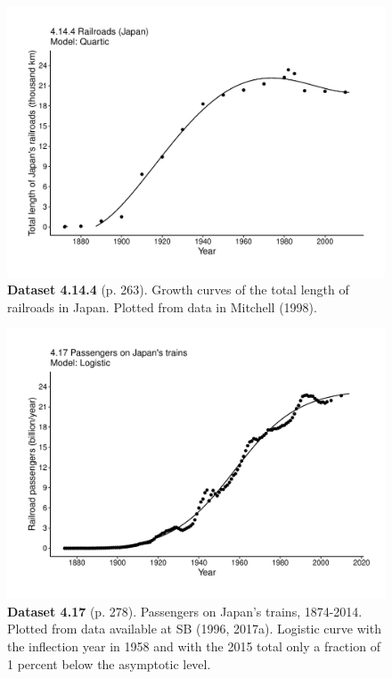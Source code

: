 \documentclass[aps,rmp,preprint,superscriptaddress,10pt,onecolumn]{article}
\begin{document}
\clearpage
\begin{figure}[h]
\includegraphics[width=\textwidth]{output/figs-ggplot/4.14.4.pdf}
\caption*{\textbf{Dataset 4.14.4} (p. 263). Growth curves of the total length of railroads in Japan. Plotted from data in Mitchell (1998).}
\end{figure}
	
\clearpage
\begin{figure}[h]
\includegraphics[width=\textwidth]{output/figs-ggplot/4.17.pdf}
\caption*{\textbf{Dataset 4.17} (p. 278). Passengers on Japan's trains, 1874-2014. Plotted from data available at SB (1996, 2017a). Logistic curve with the inflection year in 1958 and with the 2015 total only a fraction of 1 percent below the asymptotic level.}
\end{figure}
	
\end{document}
